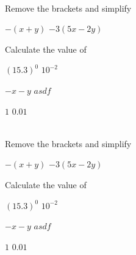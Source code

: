  \begin{Exercise}\label{EX11} 
 	\textbf{\Large{}}\\
 	\Question Remove the brackets and simplify
 	\begin{tasks}
\task 	 $ -\left (x +y\right )$ 
\task    $ -3 (5 x -2 y)$
 	\end{tasks}

 	\Question Calculate the value of
 	\begin{tasks}
 		\task 	 $\left (15.3\right )^{0}$
 		\task    $10^{ -2}$
 	\end{tasks}
 \end{Exercise}
 \begin{Answer}[ref={EX11}]
 		\Question %
 	\begin{tasks}
 		\task 	 $-x -y $ 
 		\task    $asdf $
 	\end{tasks}
 	
 	\Question %
 	\begin{tasks}
 		\task 	 $1$
 		\task    $0.01$
 	\end{tasks}
 \end{Answer}
 \begin{Exercise}\label{EX12} 
	\textbf{\Large{}}\\
	\Question Remove the brackets and simplify
	\begin{tasks}
		\task 	 $ -\left (x +y\right )$ 
		\task    $ -3 (5 x -2 y)$
	\end{tasks}
	
	\Question Calculate the value of
	\begin{tasks}
		\task 	 $\left (15.3\right )^{0}$
		\task    $10^{ -2}$
	\end{tasks}
\end{Exercise}
\begin{Answer}[ref={EX12}]
	\Question %
	\begin{tasks}
		\task 	 $-x -y $ 
		\task    $asdf $
	\end{tasks}
	
	\Question %
	\begin{tasks}
		\task 	 $1$
		\task    $0.01$
	\end{tasks}
\end{Answer}

